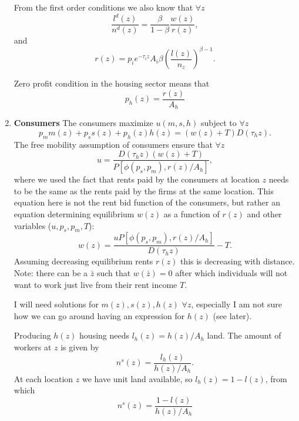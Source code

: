 \documentclass[10pt]{article}
\begin{document}
\begin{enumerate}
From the first order conditions we also know that $\forall z$
\begin{equation}
\frac{l^d(z)}{n^d(z)}=\frac{\beta}{1-\beta}\frac{w(z)}{r(z)},
\end{equation}
and
\begin{equation}
r(z)=p_ie^{-\tau_iz}A_i\beta\left(\frac{l(z)}{n_z}\right)^{\beta-1}.
\end{equation}

Zero profit condition in the housing sector means that
\begin{equation}
p_h(z)=\frac{r(z)}{A_h}
\end{equation}

\item \textbf{Consumers}
The consumers maximize $u(m,s,h)$ subject to $\forall z$
\begin{equation*}
p_mm(z)+p_ss(z)+p_h(z)h(z)=(w(z)+T)D(\tau_hz).
\end{equation*}
The free mobility assumption of consumers ensure that $\forall z$
\begin{equation}
u=\frac{D(\tau_hz)(w(z)+T)}{P\left[\phi(p_s,p_m),r(z)/A_h\right]},
\end{equation}
where we used the fact that rents paid by the consumers at location $z$ needs to be the same as the rents paid by the firms at the same location. This equation here is not the rent bid function of the consumers, but rather an equation determining equilibrium $w(z)$ as a function of $r(z)$ and other variables ($u, p_s, p_m,T$):
\begin{equation*}
w(z)=\frac{uP\left[\phi(p_s,p_m),r(z)/A_h\right]}{D(\tau_hz)}-T.
\end{equation*}
Assuming decreasing equilibrium rents $r(z)$ this is decreasing with distance. Note: there can be a $\bar{z}$ such that $w(\bar{z})=0$ after which individuals will not want to work just live from their rent income $T$.

I will need solutions for $m(z),s(z),h(z)$ $\forall z$, especially I am not sure how we can go around having an expression for $h(z)$ (see later).

Producing $h(z)$ housing needs $l_h(z)=h(z)/A_h$ land. The amount of workers at $z$ is given by
\begin{equation*}
n^s(z)=\frac{l_h(z)}{h(z)/A_h}.
\end{equation*}
At each location $z$ we have unit land available, so $l_h(z)=1-l(z)$, from which
\begin{equation}
n^s(z)=\frac{1-l(z)}{h(z)/A_h}
\end{equation}


\end{enumerate}
\end{document}
